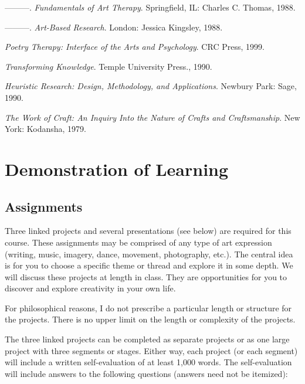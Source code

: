 \documentclass[letterpaper,10pt,headsepline]{scrreprt}
\begin{document}
\begin{description}
\item ---------. \textit{Fundamentals of Art Therapy}. Springfield, IL: Charles C. Thomas, 1988.
\item ---------. \textit{Art-Based Research}. London: Jessica Kingsley, 1988.
\item [Mazza, Nick] \textit{Poetry Therapy: Interface of the Arts and Psychology}. CRC Press, 1999.
\item [Minnich, E. K.] \textit{Transforming Knowledge}. Temple University Press., 1990.
\item [Moustakas, C.] \textit{Heuristic Research: Design, Methodology, and Applications}. Newbury Park: Sage, 1990.
\item [Needleman, Carla] \textit{The Work of Craft: An Inquiry Into the Nature of Crafts and Craftsmanship}. New York: Kodansha, 1979.

\end{description}

\clearpage

\section{Demonstration of Learning}

\subsection{Assignments}
Three linked projects and several presentations (see below) are required for this course. These assignments may be comprised of any type of art expression (writing, music, imagery, dance, movement, photography, etc.). The central idea is for you to choose a specific theme or thread and explore it in some depth. We will discuss these projects at length in class. They are opportunities for you to discover and explore creativity in your own life.

For philosophical reasons, I do not prescribe a particular length or structure for the projects. There is no upper limit on the length or complexity of the projects.

The three linked projects can be completed as separate projects or as one large project with three segments or stages. Either way, each project (or each segment) will include a written self-evaluation of at least 1,000 words. The self-evaluation will include answers to the following questions (answers need not be itemized): 
\end{document}
